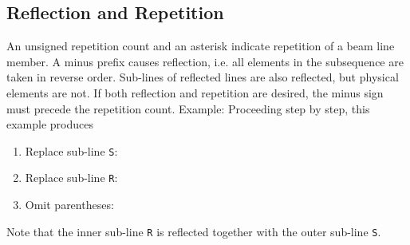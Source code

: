 \subsection{Reflection and Repetition}
An unsigned repetition count and an asterisk indicate
repetition of a beam line member.
A minus prefix causes reflection,
i.e. all elements in the subsequence are taken in reverse order.
Sub-lines of reflected lines are also reflected,
but physical elements are not.
If both reflection and repetition are desired,
the minus sign must precede the repetition count.
Example:
Proceeding step by step, this example produces
\begin{enumerate}
\item Replace sub-line {\tt S}:
\item Replace sub-line {\tt R}:
\item Omit parentheses:
\end{enumerate}
Note that the inner sub-line {\tt R} is reflected together with
the outer sub-line {\tt S}.
 
